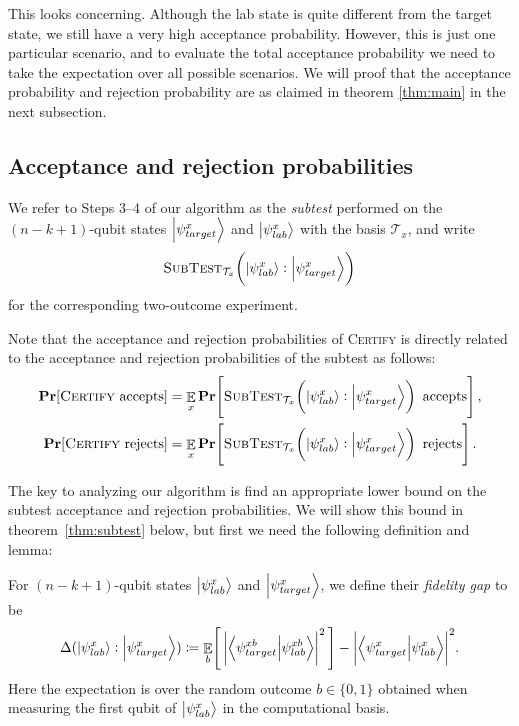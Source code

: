 This looks concerning. Although the lab state is quite different from the target state, we still have a very high acceptance probability. 
However, this is just one particular scenario, and to evaluate the total acceptance probability we need to take the expectation over all possible scenarios. 
We will proof that the acceptance probability and rejection probability are as claimed in theorem \ref{thm:main} in the next subsection.

\subsection{Acceptance and rejection probabilities}\label{sec:accept-reject}

We refer to Steps 3--4 of our algorithm as the \emph{subtest} 
performed on the $(n-k+1)$-qubit states $\ket{\psi_{target}^x}$ and 
$\ket{\psi_{lab}^x}$ with the basis $\mathcal{T}_x$, and write
\[
    \textsc{SubTest}_{\mathcal{T}_x}\!\left(\ket{\psi_{lab}^x}:\ket{\psi_{target}^x}\right)
\]
for the corresponding two-outcome experiment.

Note that the acceptance and rejection probabilities of \textsc{Certify} is
directly related to the acceptance and rejection probabilities of the subtest as follows:
\begin{align*}
    \operatorname{{\bf Pr}}[\textsc{Certify}\text{ accepts}] &= \mathop{\mathbb{E}}_{x}\operatorname{{\bf Pr}}\!\left[\textsc{SubTest}_{\mathcal{T}_x}\!\left(\ket{\psi_{lab}^x}:\ket{\psi_{target}^x}\right)\text{ accepts}\right],\\
    \operatorname{{\bf Pr}}[\textsc{Certify}\text{ rejects}] &= \mathop{\mathbb{E}}_{x}\operatorname{{\bf Pr}}\!\left[\textsc{SubTest}_{\mathcal{T}_x}\!\left(\ket{\psi_{lab}^x}:\ket{\psi_{target}^x}\right)\text{ rejects}\right].
\end{align*}

The key to analyzing our algorithm is find an appropriate lower bound 
on the subtest acceptance and rejection probabilities. We will 
show this bound in theorem~\ref{thm:subtest} below, but first we need the following
definition and lemma:

\begin{definition}
    For $(n-k+1)$-qubit states $\ket{\psi_{lab}^x}$ and $\ket{\psi_{target}^x}$, 
    we define their \emph{fidelity gap} to be
    \[
        \Delta(\ket{\psi_{lab}^x}:\ket{\psi_{target}^x}) \coloneqq \mathop{\mathbb{E}}_{b}\!\left[\,{\left| \braket{\psi_{target}^{xb}}{\psi_{lab}^{xb}} \right|}^2\,\right] - {\left| \braket{\psi_{target}^x}{\psi_{lab}^x} \right|}^2.
    \]
    Here the expectation is over the random outcome $b \in \{0,1\}$ 
    obtained when measuring the first qubit of $\ket{\psi_{lab}^x}$ in the computational basis.
\end{definition}


